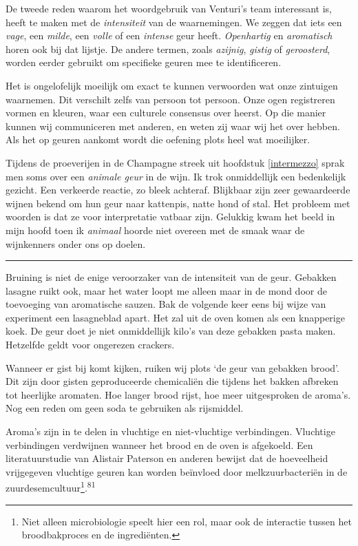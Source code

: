 \documentclass[
  11pt,
  dutch,
]{memoir}
\begin{document}
De tweede reden waarom het woordgebruik van Venturi's team interessant
is, heeft te maken met de \emph{intensiteit} van de waarnemingen. We
zeggen dat iets een \emph{vage}, een \emph{milde}, een \emph{volle} of
een \emph{intense} geur heeft. \emph{Openhartig} en \emph{aromatisch}
horen ook bij dat lijstje. De andere termen, zoals \emph{azijnig},
\emph{gistig} of \emph{geroosterd}, worden eerder gebruikt om specifieke
geuren mee te identificeren.

Het is ongelofelijk moeilijk om exact te kunnen verwoorden wat onze
zintuigen waarnemen. Dit verschilt zelfs van persoon tot persoon. Onze
ogen registreren vormen en kleuren, waar een culturele consensus over
heerst. Op die manier kunnen wij communiceren met anderen, en weten zij
waar wij het over hebben. Als het op geuren aankomt wordt die oefening
plots heel wat moeilijker.

Tijdens de proeverijen in de Champagne streek uit hoofdstuk
\ref{intermezzo} sprak men soms over een \emph{animale geur} in de wijn.
Ik trok onmiddellijk een bedenkelijk gezicht. Een verkeerde reactie, zo
bleek achteraf. Blijkbaar zijn zeer gewaardeerde wijnen bekend om hun
geur naar kattenpis, natte hond of stal. Het probleem met woorden is dat
ze voor interpretatie vatbaar zijn. Gelukkig kwam het beeld in mijn
hoofd toen ik \emph{animaal} hoorde niet overeen met de smaak waar de
wijnkenners onder ons op doelen.

\pfbreak

Bruining is niet de enige veroorzaker van de intensiteit van de geur.
Gebakken lasagne ruikt ook, maar het water loopt me alleen maar in de
mond door de toevoeging van aromatische sauzen. Bak de volgende keer
eens bij wijze van experiment een lasagneblad apart. Het zal uit de oven
komen als een knapperige koek. De geur doet je niet onmiddellijk kilo's
van deze gebakken pasta maken. Hetzelfde geldt voor ongerezen crackers.

Wanneer er gist bij komt kijken, ruiken wij plots `de geur van gebakken
brood'. Dit zijn door gisten geproduceerde chemicaliën die tijdens het
bakken afbreken tot heerlijke aromaten. Hoe langer brood rijst, hoe meer
uitgesproken de aroma's. Nog een reden om geen soda te gebruiken als
rijsmiddel.

Aroma's zijn in te delen in vluchtige en niet-vluchtige verbindingen.
Vluchtige verbindingen verdwijnen wanneer het brood en de oven is
afgekoeld. Een literatuurstudie van Alistair Paterson en anderen bewijst
dat de hoeveelheid vrijgegeven vluchtige geuren kan worden beïnvloed
door melkzuurbacteriën in de
zuurdesemcultuur\footnote{Niet alleen microbiologie speelt hier een rol,
  maar ook de interactie tussen het broodbakproces en de ingrediënten.}.\textsuperscript{81}
\end{document}
